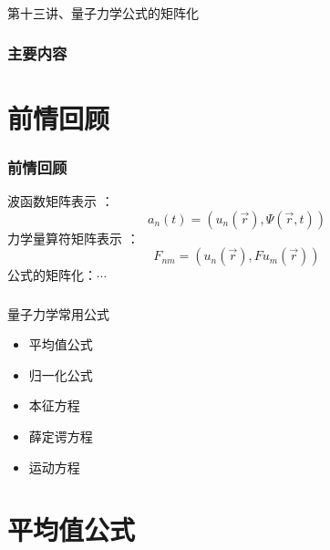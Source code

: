 \begin{frame} [plain]
    \frametitle{}
    \Background[1] 
    \begin{center}
    { {\huge 第十三讲、量子力学公式的矩阵化 }}
    \end{center}  
    \addtocounter{framenumber}{-1}   
\end{frame}

\begin{frame}
        \frametitle{主要内容}
        \transfade
        \tableofcontents
        \addtocounter{framenumber}{-1} 
\end{frame}

\section{前情回顾}


\begin{frame}
    \frametitle{前情回顾}
    \begin{itemize}
       \done 波函数矩阵表示 ：$$ a_n(t)=(u_n(\vec{r}), \Psi(\vec{r},t)) $$ 
       \done 力学量算符矩阵表示 ： $$ F_{nm}=(u_n (\vec{r}), Fu_m(\vec{r})) $$   
       \todo 公式的矩阵化：$\cdots$
    \end{itemize}
\end{frame} 



\begin{frame} 
    \frametitle{}
    \begin{tcolorbox2}{量子力学常用公式}
        \begin{itemize}
            \item 平均值公式
            \item 归一化公式
            \item 本征方程
            \item 薛定谔方程
            \item 运动方程
        \end{itemize}   
    \end{tcolorbox2}
\end{frame} 

\section{平均值公式}


